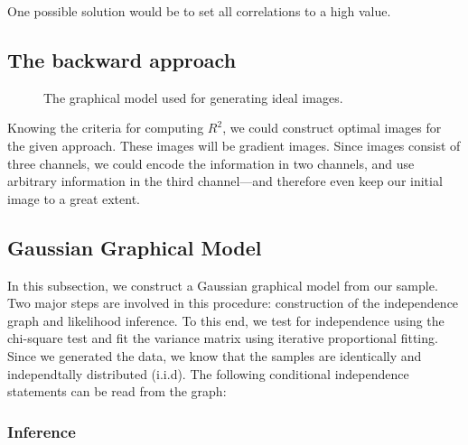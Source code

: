 \documentclass{article}
\begin{document}

One possible solution would be to set all correlations to a high
value.

\subsection{The backward approach}

\begin{figure}[h]
  \centering
  \caption{The graphical model used for generating ideal images.}
\end{figure}

Knowing the criteria for computing $R^2$, we could construct optimal
images for the given approach. These images will be gradient
images. Since images consist of three channels, we could encode the
information in two channels, and use arbitrary information in the
third channel---and therefore even keep our initial image to a great
extent.


\subsection{Gaussian Graphical Model}

In this subsection, we construct a Gaussian graphical model from our
sample. Two major steps are involved in this procedure: construction
of the independence graph and likelihood inference. To this end, we
test for independence using the chi-square test and fit the variance
matrix using iterative proportional fitting. Since we generated the
data, we know that the samples are identically and independtally
distributed (i.i.d). The following conditional independence statements
can be read from the graph:


\subsubsection{Inference}
\end{document}
